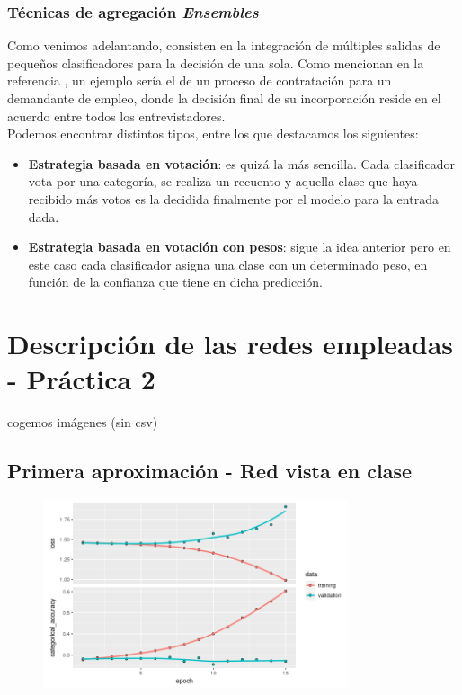 \documentclass[]{article}
\begin{document}
		\subsubsection{Técnicas de agregación \textit{Ensembles}}
		
			Como venimos adelantando, consisten en la integración de múltiples salidas de pequeños clasificadores para la decisión de una sola. Como mencionan en la referencia \cite{ensembling-methods}, un ejemplo sería el de un proceso de contratación para un demandante de empleo, donde la decisión final de su incorporación reside en el acuerdo entre todos los entrevistadores.\\
			
			Podemos encontrar distintos tipos, entre los que destacamos los siguientes:
			
			\begin{itemize}
				\item \textbf{Estrategia basada en votación}: es quizá la más sencilla. Cada clasificador vota por una categoría, se realiza un recuento y aquella clase que haya recibido más votos es la decidida finalmente por el modelo para la entrada dada.
				\item \textbf{Estrategia basada en votación con pesos}: sigue la idea anterior pero en este caso cada clasificador asigna una clase con un determinado peso, en función de la confianza que tiene en dicha predicción.
			\end{itemize}
		
\section{Descripción de las redes empleadas - Práctica 2}

	cogemos imágenes (sin csv) 

	\subsection{Primera aproximación - Red vista en clase}
	
		\begin{figure}[h]
			\centering
			\includegraphics[width=0.8\textwidth]{./img/model1}
			\caption{}
			\label{}
		\end{figure}
	
\end{document}
